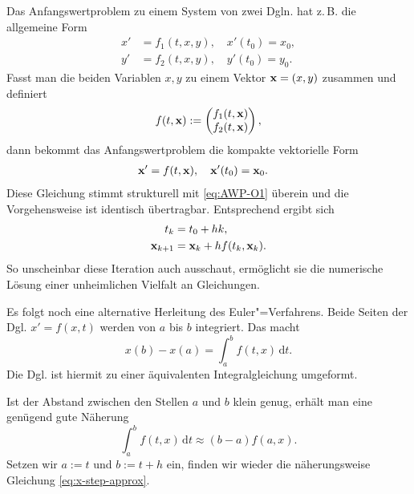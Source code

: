 Das Anfangswertproblem zu einem System von zwei Dgln. hat
z.\,B. die allgemeine Form
\begin{equation}
\begin{split}
x' &= f_1(t,x,y),\quad x'(t_0)=x_0,\\
y' &= f_2(t,x,y),\quad y'(t_0)=y_0.
\end{split}
\end{equation}
Fasst man die beiden Variablen $x,y$ zu einem Vektor
$\mathbf{x} = (x,y)$ zusammen und definiert
\begin{equation}
f(t,\mathbf{x}) := \begin{pmatrix}
f_1(t,\mathbf{x})\\
f_2(t,\mathbf{x})
\end{pmatrix},
\end{equation}
dann bekommt das Anfangswertproblem die kompakte
vektorielle Form
\begin{equation}
\begin{split}
\mathbf{x}' &= f(t,\mathbf{x}),\quad \mathbf{x}'(t_0)=\mathbf{x}_0.
\end{split}
\end{equation}
Diese Gleichung stimmt strukturell mit \eqref{eq:AWP-O1} überein
und die Vorgehensweise ist identisch übertragbar. Entsprechend ergibt
sich
\begin{align}
t_{k} &= t_0+hk,\\
\mathbf{x}_{k+1} &= \mathbf{x}_k+hf(t_k,\mathbf{x}_k).
\end{align}
So unscheinbar diese Iteration auch ausschaut, ermöglicht sie die
numerische Lösung einer unheimlichen Vielfalt an Gleichungen.

Es folgt noch eine alternative Herleitung des Euler"=Verfahrens. Beide
Seiten der Dgl. $x'=f(x,t)$ werden
von $a$ bis $b$ integriert. Das macht%
\begin{equation}
x(b)-x(a) = \int_a^b f(t,x)\,\mathrm dt.
\end{equation}
Die Dgl. ist hiermit zu einer äquivalenten Integralgleichung umgeformt.

Ist der Abstand zwischen den Stellen $a$ und $b$ klein genug, erhält
man eine genügend gute Näherung%
\[\int_a^b f(t,x)\,\mathrm dt \approx (b-a)f(a,x).\]
Setzen wir $a:=t$ und $b:=t+h$ ein, finden wir
wieder die näherungsweise Gleichung \eqref{eq:x-step-approx}.

